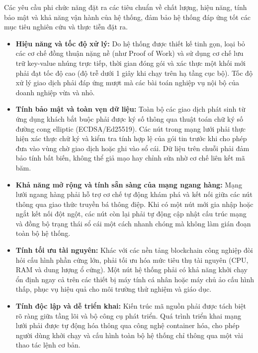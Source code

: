 \documentclass[12pt,a4paper]{article}
\begin{document}
Các yêu cầu phi chức năng đặt ra các tiêu chuẩn về chất lượng, hiệu năng, tính bảo mật và khả năng vận hành của hệ thống, đảm bảo hệ thống đáp ứng tốt các mục tiêu nghiên cứu và thực tiễn đặt ra.

\begin{itemize}
    \item \textbf{Hiệu năng và tốc độ xử lý:} 
    Do hệ thống được thiết kế tinh gọn, loại bỏ các cơ chế đồng thuận nặng nề (như Proof of Work) và sử dụng cơ chế lưu trữ key-value nhúng trực tiếp, thời gian đóng gói và xác thực một khối mới phải đạt tốc độ cao (độ trễ dưới 1 giây khi chạy trên hạ tầng cục bộ). Tốc độ xử lý giao dịch phải đáp ứng mượt mà các bài toán nghiệp vụ nội bộ của doanh nghiệp vừa và nhỏ.

    \item \textbf{Tính bảo mật và toàn vẹn dữ liệu:} 
    Toàn bộ các giao dịch phát sinh từ ứng dụng khách bắt buộc phải được ký số thông qua thuật toán chữ ký số đường cong elliptic (ECDSA/Ed25519). Các nút trong mạng lưới phải thực hiện xác thực chữ ký và kiểm tra tính hợp lệ của gói tin trước khi cho phép đưa vào vùng chờ giao dịch hoặc ghi vào sổ cái. Dữ liệu trên chuỗi phải đảm bảo tính bất biến, không thể giả mạo hay chỉnh sửa nhờ cơ chế liên kết mã băm.

    \item \textbf{Khả năng mở rộng và tính sẵn sàng của mạng ngang hàng:} 
    Mạng lưới ngang hàng phải hỗ trợ cơ chế tự động khám phá và kết nối giữa các nút thông qua giao thức truyền bá thông điệp. Khi có một nút mới gia nhập hoặc ngắt kết nối đột ngột, các nút còn lại phải tự động cập nhật cấu trúc mạng và đồng bộ trạng thái sổ cái một cách nhanh chóng mà không làm gián đoạn toàn bộ hệ thống.

    \item \textbf{Tính tối ưu tài nguyên:} 
    Khác với các nền tảng blockchain công nghiệp đòi hỏi cấu hình phần cứng lớn, phải tối ưu hóa mức tiêu thụ tài nguyên (CPU, RAM và dung lượng ổ cứng). Một nút hệ thống phải có khả năng khởi chạy ổn định ngay cả trên các thiết bị máy tính cá nhân hoặc máy chủ ảo cấu hình thấp, phục vụ hiệu quả cho môi trường thử nghiệm và giáo dục.

    \item \textbf{Tính độc lập và dễ triển khai:} 
    Kiến trúc mã nguồn phải được tách biệt rõ ràng giữa tầng lõi và bộ công cụ phát triển. Quá trình triển khai mạng lưới phải được tự động hóa thông qua công nghệ container hóa, cho phép người dùng khởi chạy và cấu hình toàn bộ hệ thống chỉ thông qua một vài thao tác lệnh cơ bản.
\end{itemize}\newpage
\end{document}

